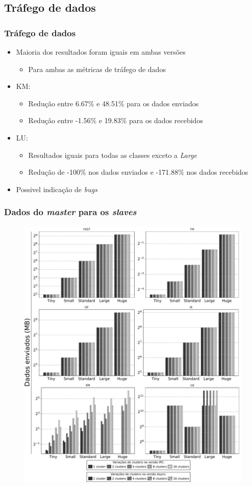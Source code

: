 \documentclass[xcolor={table}]{beamer}
\begin{document}
\subsection{Tráfego de dados}
\begin{frame}\frametitle{Tráfego de dados}
    \begin{itemize}
        \item {Maioria dos resultados foram iguais em ambas versões}
        \begin{itemize}
            \item {Para ambas as métricas de tráfego de dados}
        \end{itemize}
        \item {KM:}
        \begin{itemize}
            \item {Redução entre 6.67\% e 48.51\% para os dados enviados}
            \item {Redução entre -1.56\% e 19.83\% para os dados recebidos}
        \end{itemize}
        \item {LU:}
        \begin{itemize}
            \item {Resultados iguais para todas as classes exceto a \textit{Large}}
            \item {Redução de -100\% nos dados enviados e -171.88\% nos dados recebidos}
        \end{itemize}
        \item {Possivel indicação de \textit{bugs}}
    \end{itemize}
\end{frame}

\begin{frame}\frametitle{Dados do \textit{master} para os \textit{slaves}}
    \begin{figure}[h]
      \centering
      \label{fig:datasent}
      \includegraphics[width=.65\linewidth, keepaspectratio]{figs/data_sent.pdf}
    \end{figure}
\end{frame}
\end{document}
